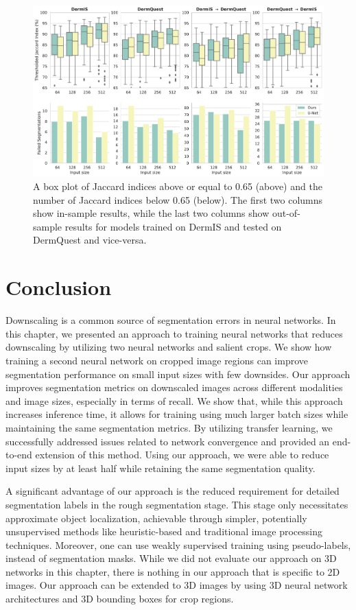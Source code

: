 \begin{figure}[t!]
\includegraphics[width=\textwidth]{images/5/e2e/boxplots.pdf}
\caption{A box plot of Jaccard indices above or equal to 0.65 (above) and the number of Jaccard indices below 0.65 (below). The first two columns show in-sample results, while the last two columns show out-of-sample results for models trained on DermIS and tested on DermQuest and vice-versa.} \label{fig:box-plot}
\end{figure}

\clearpage

\section{Conclusion}

Downscaling is a common source of segmentation errors in neural networks. In this chapter, we presented an approach to training neural networks that reduces downscaling by utilizing two neural networks and salient crops. We show how training a second neural network on cropped image regions can improve segmentation performance on small input sizes with few downsides. Our approach improves segmentation metrics on downscaled images across different modalities and image sizes, especially in terms of recall. We show that, while this approach increases inference time, it allows for training using much larger batch sizes while maintaining the same segmentation metrics. By utilizing transfer learning, we successfully addressed issues related to network convergence and provided an end-to-end extension of this method. Using our approach, we were able to reduce input sizes by at least half while retaining the same segmentation quality.

A significant advantage of our approach is the reduced requirement for detailed segmentation labels in the rough segmentation stage. This stage only necessitates approximate object localization, achievable through simpler, potentially unsupervised methods like heuristic-based and traditional image processing techniques. Moreover, one can use weakly supervised training using pseudo-labels, instead of segmentation masks. While we did not evaluate our approach on 3D networks in this chapter, there is nothing in our approach that is specific to 2D images. Our approach can be extended to 3D images by using 3D neural network architectures and 3D bounding boxes for crop regions.

